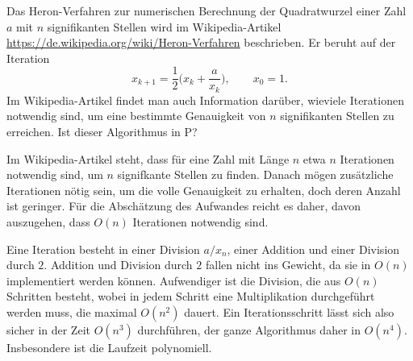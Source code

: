 Das Heron-Verfahren zur numerischen Berechnung der Quadratwurzel einer Zahl
$a$ mit $n$ signifikanten Stellen wird im Wikipedia-Artikel
\url{https://de.wikipedia.org/wiki/Heron-Verfahren}
beschrieben.
Er beruht auf der Iteration
\[
x_{k+1}= \frac12\biggl(x_k+\frac{a}{x_k}\biggr),\qquad x_0=1.
\]
Im Wikipedia-Artikel findet man auch Information darüber, wieviele
Iterationen notwendig sind, um eine bestimmte Genauigkeit von $n$ signifikanten
Stellen zu erreichen.
Ist dieser Algorithmus in P?


\begin{loesung}
Im Wikipedia-Artikel steht, dass für eine Zahl mit Länge $n$ etwa $n$
Iterationen notwendig sind, um $n$ signifkante Stellen zu finden.
Danach mögen zusätzliche Iterationen nötig sein, um die volle Genauigkeit
zu erhalten, doch deren Anzahl ist geringer.
Für die Abschätzung des Aufwandes reicht es daher, davon auszugehen, dass
$O(n)$ Iterationen notwendig sind.

Eine Iteration besteht in einer Division $a/x_n$, einer Addition und
einer Division durch $2$. 
Addition und Division durch $2$
fallen nicht ins Gewicht, da sie in $O(n)$
implementiert werden können.
Aufwendiger ist die Division, die aus $O(n)$ Schritten besteht, wobei
in jedem Schritt eine Multiplikation durchgeführt werden muss, die
maximal $O(n^2)$ dauert.
Ein Iterationsschritt lässt sich also sicher in der Zeit $O(n^3)$ durchführen,
der ganze Algorithmus daher in $O(n^4)$.
Insbesondere ist die Laufzeit polynomiell.
\end{loesung}
